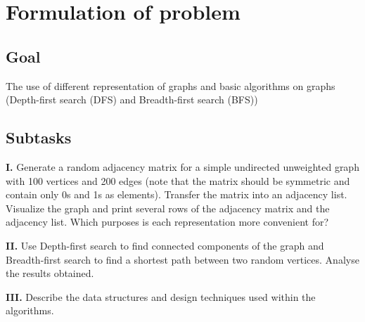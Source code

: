 \section*{Formulation of problem}

\subsection*{Goal}

The use of different representation of graphs and basic algorithms on graphs (Depth-first search (DFS) and Breadth-first search (BFS))

\subsection*{Subtasks}
\textbf{I.} Generate a random adjacency matrix for a simple undirected unweighted graph with 100 vertices and 200 edges (note that the matrix should be symmetric and contain only 0s and 1s as elements). Transfer the matrix into an adjacency list.
Visualize the graph and print several rows of the adjacency matrix and the adjacency list. Which purposes is each representation more convenient for?

\textbf{II.}  Use Depth-first search to find connected components of the graph and Breadth-first search to find a shortest path between two random vertices. Analyse the results obtained.

\textbf{III.} Describe the data structures and design techniques used within the algorithms.